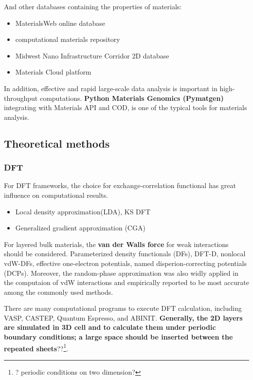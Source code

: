 \documentclass[a4paper, 11pt]{article}
\numberwithin{equation}{subsection}
\begin{document}
And other databases containing the properties of materials:

\begin{itemize}
  \item MaterialsWeb online database
  \item computational materials repository
  \item Midwest Nano Infrastructure Corridor 2D database
  \item Materials Cloud platform
\end{itemize}

In addition, effective and rapid large-scale data analysis is important in high-throughput computations. \textbf{Python Materials Genomics (Pymatgen)} integrating with Materials API and COD, is one of the typical tools for materials analysis.

\subsection{Theoretical methods}

\subsubsection{DFT} For DFT frameworks, the choice for exchange-correlation functional has great influence on computational results.

\begin{itemize}
  \item Local density approximation(LDA), KS DFT
  \item Generalized gradient approximation (CGA)
\end{itemize}

For layered bulk materials, the \textbf{van der Walls force }for weak interactions should be considered. Parameterized density functionals (DFs), DFT-D, nonlocal vdW-DFs, effective one-electron potentials, named disperion-correcting potentials (DCPs). Moreover, the random-phase approximation was also widly applied in the computaion of vdW interactions and empirically reported to be most accurate among the commonly used methods. 

There are many computational programs to execute DFT calculation, including VASP, CASTEP, Quantum Espresso, and ABINIT. \textbf{Generally, the 2D layers are simulated in 3D cell and to calculate them under periodic boundary conditions; a large space should be inserted between the repeated sheets}??\footnote{? periodic conditions on two dimension?}.
\end{document}
